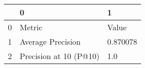 \begin{tabular}{lll}
\toprule
{} &                       0 &         1 \\
\midrule
0 &                  Metric &     Value \\
1 &       Average Precision &  0.870078 \\
2 &  Precision at 10 (P@10) &       1.0 \\
\bottomrule
\end{tabular}
